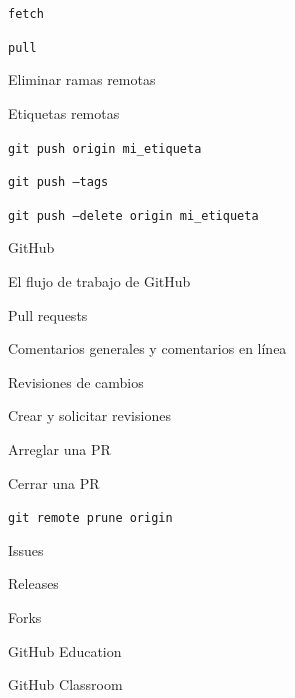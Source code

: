\begin{longenum}
\begin{longenum}
\begin{longenum}
\begin{longenum}
                \item \texttt{fetch}
                \item \texttt{pull}
            \end{longenum}
            \item Eliminar ramas remotas
            \item Etiquetas remotas
            \begin{longenum}
                \item \texttt{git push origin mi\_etiqueta}
                \item \texttt{git push --tags}
                \item \texttt{git push --delete origin mi\_etiqueta}
            \end{longenum}
        \end{longenum}
        \item GitHub
        \begin{longenum}
            \item El flujo de trabajo de GitHub
            \item Pull requests
            \begin{longenum}
                \item Comentarios generales y comentarios en línea
                \item Revisiones de cambios
                \begin{longenum}
                    \item Crear y solicitar revisiones
                \end{longenum}
                \item Arreglar una PR
                \item Cerrar una PR
                \begin{longenum}
                    \item \texttt{git remote prune origin}
                \end{longenum}
            \end{longenum}
            \item Issues
            \item Releases
            \item Forks
            \item GitHub Education
            \begin{longenum}
                \item GitHub Classroom
            \end{longenum}
        \end{longenum}
    \end{longenum}
\end{longenum}
